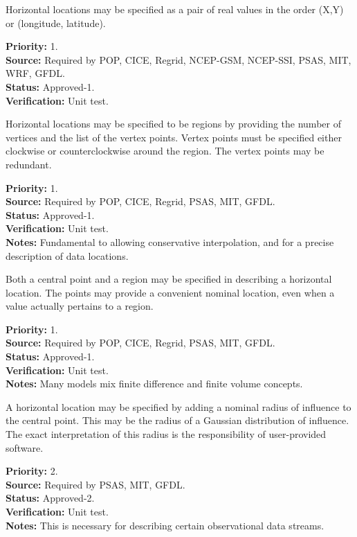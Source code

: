 Horizontal locations may be specified as a pair of real values in the order
(X,Y) or (longitude, latitude).
\begin{reqlist}
{\bf Priority:} 1. \\
{\bf Source:} Required by POP, CICE, Regrid, NCEP-GSM, NCEP-SSI,
              PSAS, MIT, WRF, GFDL. \\
{\bf Status:} Approved-1. \\
{\bf Verification:} Unit test.
\end{reqlist}



  Horizontal locations may be specified to be regions by providing the number
of vertices and the list of the vertex points.  Vertex points must be specified
either clockwise or counterclockwise around the region.  The vertex points
may be redundant.
\begin{reqlist}
{\bf Priority:} 1. \\
{\bf Source:} Required by POP, CICE, Regrid, PSAS, MIT, GFDL. \\
{\bf Status:} Approved-1. \\
{\bf Verification:} Unit test.\\
{\bf Notes:} Fundamental to allowing conservative interpolation, and for a
precise description of data locations.
\end{reqlist}
 

  Both a central point and a region may be specified in describing a horizontal
location.  The points may provide a convenient nominal location, even when
a value actually pertains to a region.
\begin{reqlist}
{\bf Priority:} 1. \\
{\bf Source:} Required by POP, CICE, Regrid, PSAS, MIT, GFDL. \\
{\bf Status:} Approved-1. \\
{\bf Verification:} Unit test.\\
{\bf Notes:} Many models mix finite difference and finite volume concepts.
\end{reqlist}


  A horizontal location may be specified by adding a nominal radius of
influence to the central point.  This may be the radius of a Gaussian
distribution of influence. The exact interpretation of this radius is
the responsibility of user-provided software.
\begin{reqlist}
{\bf Priority:} 2. \\
{\bf Source:} Required by PSAS, MIT, GFDL. \\
{\bf Status:} Approved-2. \\
{\bf Verification:} Unit test.\\
{\bf Notes:} This is necessary for describing certain observational data streams.
\end{reqlist}



